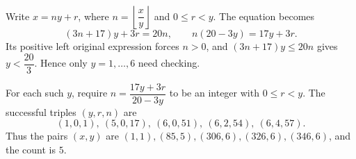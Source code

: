 Write $x=ny+r$, where $n=\left\lfloor\dfrac{x}{y}\right\rfloor$ and $0\le r<y$. The equation becomes
\[
(3n+17)y+3r=20n,\qquad n(20-3y)=17y+3r.
\]
Its positive left original expression forces $n>0$, and $(3n+17)y\le20n$ gives $y<\dfrac{20}{3}$. Hence only $y=1,\ldots,6$ need checking.

For each such $y$, require $n=\dfrac{17y+3r}{20-3y}$ to be an integer with $0\le r<y$. The successful triples $(y,r,n)$ are
\[
(1,0,1),\ (5,0,17),\ (6,0,51),\ (6,2,54),\ (6,4,57).
\]
Thus the pairs $(x,y)$ are $(1,1),(85,5),(306,6),(326,6),(346,6)$, and the count is $\boxed5$.
